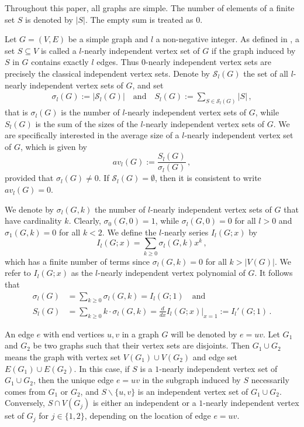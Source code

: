 \documentclass[a4paper,12pt]{amsart}
\theoremstyle{remark}
\begin{document}
Throughout this paper, all graphs are simple. The number of elements of a finite set $S$ is denoted by $|S|$. The empty sum is treated as $0$.

Let $G=(V,E)$ be a simple graph and $l$ a non-negative integer. As defined in \cite{shozi2024vertex}, a set $S\subseteq V$ is called a $l$-nearly independent vertex set of $G$ if the graph induced by $S$ in $G$ contains exactly $l$ edges. Thus $0$-nearly independent vertex sets are precisely the classical independent vertex sets. Denote by $\mathcal{S}_l(G)$ the set of all $l$-nearly independent vertex sets of $G$, and set
\begin{align*}
\sigma_l(G):=|\mathcal{S}_l(G)| \quad \text{and} \quad S_l(G):=\sum_{S \in \mathcal{S}_l(G)} |S|\,,
\end{align*}
that is $\sigma_l(G)$ is the number of $l$-nearly independent vertex sets of $G$, while $S_l(G)$ is the sum of the sizes of the $l$-nearly independent vertex sets of $G$. We are specifically interested in the average size of a $l$-nearly independent vertex set of $G$, which is given by
$$av_l(G):=\frac{S_l(G)}{\sigma_l(G)}\,,$$
provided that $\sigma_l(G)\neq 0$. If  $\mathcal{S}_l(G)=\emptyset$, then it is consistent to write $av_l(G)=0$.


We denote by $\sigma_l(G,k)$ the number of $l$-nearly independent vertex sets of $G$ that have cardinality $k$. Clearly, $\sigma_0(G,0)=1$, while $\sigma_l(G,0)=0$ for all $l>0$ and $\sigma_1(G,k)=0$ for all $k<2$. We define the $l$-nearly series $I_l(G;x)$ by
$$ I_l(G;x)=\sum_{k\geq 0} \sigma_l(G,k) x^k\,,$$ which has a finite number of terms since $\sigma_l(G,k)=0$ for all $k> |V(G)|$. We refer to $I_l(G;x)$ as the $l$-nearly independent vertex polynomial of $G$. It follows that
\begin{align*}
\sigma_l(G)&=\sum_{k\geq 0} \sigma_l(G,k) = I_l(G;1)\quad \text{and}\\
S_l(G)&=\sum_{k\geq 0} k \cdot \sigma_l(G,k) = \frac{d}{dx} I_l(G;x)\Big|_{x=1}:=I_l'(G;1)\,.
\end{align*}

An edge $e$ with end vertices $u,v$ in a graph $G$ will be denoted by $e=uv$. Let $G_1$ and $G_2$ be two graphs such that their vertex sets are disjoints. Then $G_1 \cup G_2$ means the graph with vertex set $V(G_1) \cup V(G_2)$ and edge set $E(G_1) \cup E(G_2)$. In this case, if $S$ is a $1$-nearly independent vertex set of $G_1 \cup G_2$, then the unique edge $e=uv$ in the subgraph induced by $S$ necessarily comes from $G_1$ or $G_2$, and $S\backslash \{u,v\}$ is an independent vertex set of $G_1 \cup G_2$. Conversely, $S\cap V(G_j)$ is either an independent or a $1$-nearly independent vertex set of $G_j$ for $j\in \{1,2\}$, depending on the location of edge $e=uv$.
\end{document}
